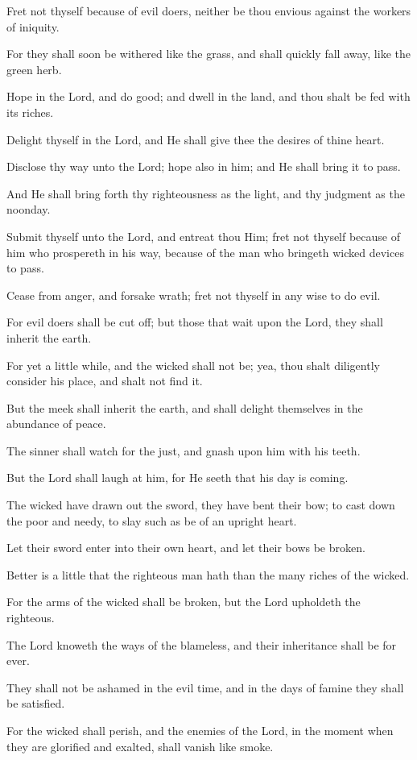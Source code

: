 Fret not thyself because of evil doers, neither be thou envious against the workers of iniquity.

For they shall soon be withered like the grass, and shall quickly fall away, like the green herb.

Hope in the Lord, and do good; and dwell in the land, and thou shalt be fed with its riches.

Delight thyself in the Lord, and He shall give thee the desires of thine heart.

Disclose thy way unto the Lord; hope also in him; and He shall bring it to pass.

And He shall bring forth thy righteousness as the light, and thy judgment as the noonday.

Submit thyself unto the Lord, and entreat thou Him; fret not thyself because of him who prospereth in his way, because of the man who bringeth wicked devices to pass.

Cease from anger, and forsake wrath; fret not thyself in any wise to do evil.

For evil doers shall be cut off; but those that wait upon the Lord, they shall inherit the earth.

For yet a little while, and the wicked shall not be; yea, thou shalt diligently consider his place, and shalt not find it.

But the meek shall inherit the earth, and shall delight themselves in the abundance of peace.

The sinner shall watch for the just, and gnash upon him with his teeth.

But the Lord shall laugh at him, for He seeth that his day is coming.

The wicked have drawn out the sword, they have bent their bow; to cast down the poor and needy, to slay such as be of an upright heart.

Let their sword enter into their own heart, and let their bows be broken.

Better is a little that the righteous man hath than the many riches of the wicked.

For the arms of the wicked shall be broken, but the Lord upholdeth the righteous.

The Lord knoweth the ways of the blameless, and their inheritance shall be for ever.

They shall not be ashamed in the evil time, and in the days of famine they shall be satisfied.

For the wicked shall perish, and the enemies of the Lord, in the moment when they are glorified and exalted, shall vanish like smoke.

